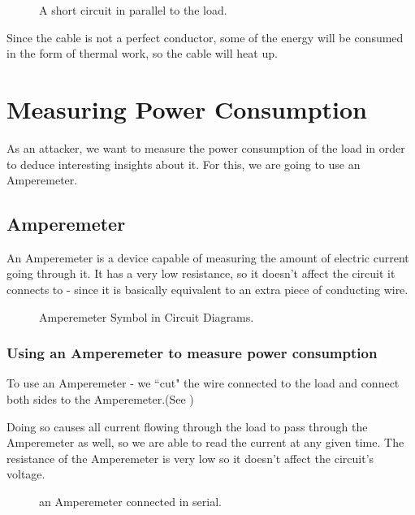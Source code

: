 \begin{figure}[!ht]
    \centering
    
    \caption{A short circuit in parallel to the load.} \label{fig:circuit4}
\end{figure}

Since the cable is not a perfect conductor, some of the energy will be consumed
in the form of thermal work, so the cable will heat up.

\section{Measuring Power Consumption}

As an attacker, we want to measure the power consumption of the load in order to deduce interesting insights about it.
For this, we are going to use an Amperemeter.

\subsection{Amperemeter}

An Amperemeter is a device capable of measuring the amount of electric current going through it. It has a very low resistance, so it doesn't affect the circuit it connects to - since it is basically equivalent to an extra piece of conducting wire.

\begin{figure}[!ht]
    \centering
    
    \caption{Amperemeter Symbol in Circuit Diagrams.} \label{fig:ampermeter}
\end{figure}

\subsubsection{Using an Amperemeter to measure power consumption}

To use an Amperemeter - we ``cut" the wire connected to the load and connect both sides to the
Amperemeter.(See )

Doing so causes all current flowing through the load to pass through the
Amperemeter as well, so we are able to read the current at any given time.
The resistance of the Amperemeter is very low so it doesn't affect the circuit's voltage.

\begin{figure}[!ht]
    \centering
    
    \caption{an Amperemeter connected in serial.} \label{fig:circuit5}
\end{figure}

